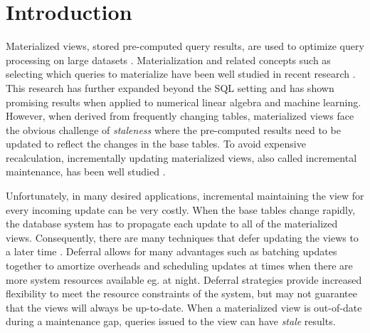 \section{Introduction}
Materialized views, stored pre-computed query results, are used to optimize query processing on large datasets \cite{gupta1995maintenance, chirkova2011materialized, halevy2001answering}.
Materialization and related concepts such as selecting which queries to materialize
have been well studied in recent research \cite{zaharia2012resilient,lefevre2014opportunistic, bailis2014scalable, perez2014history}.
This research has further expanded beyond the SQL setting \cite{nikolic2014linview} and 
has shown promising results when applied to numerical linear algebra and machine learning.
However, when derived from frequently changing tables,
materialized views face the obvious challenge of \emph{staleness} where the pre-computed results need to be updated to reflect the changes in the base tables.
To avoid expensive recalculation, incrementally updating materialized views,
also called incremental maintenance, has been well studied \cite{gupta1995maintenance, chirkova2011materialized}.

Unfortunately, in many desired applications, incremental maintaining the view for every incoming update can be very costly. 
When the base tables change rapidly, the database system has to propagate each update to all of the materialized views.
Consequently, there are many techniques that defer updating the views to a later time \cite{chirkova2011materialized, zhou2007lazy}.
Deferral allows for many advantages such as batching updates together to amortize overheads and scheduling updates at times when there are more system resources available eg. at night.
Deferral strategies provide increased flexibility to meet the resource constraints of the system, but may not guarantee that the views will always be up-to-date.
When a materialized view is out-of-date during a maintenance gap, queries issued to the view can have \emph{stale} results. 

